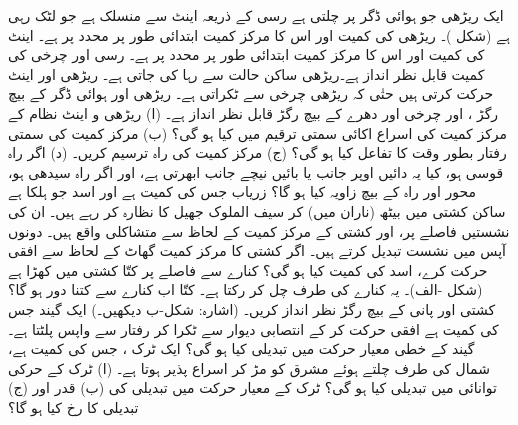 ایک ریڑھی جو ہوائی ڈگر پر چلتی ہے    رسی کے ذریعہ اینٹ سے منسلک  ہے جو لٹک رہی ہے (شکل )۔ ریڑھی کی کمیت  اور اس کا مرکز کمیت ابتدائی طور پر    محدد  پر ہے۔ اینٹ کی کمیت   اور اس کا مرکز کمیت ابتدائی طور پر  محدد   پر ہے۔ رسی اور چرخی کی کمیت قابل نظر انداز ہے۔ریڑھی ساکن حالت سے رہا کی جاتی ہے۔ ریڑھی اور اینٹ حرکت کرتی  ہیں  حتٰی کہ ریڑھی چرخی سے ٹکراتی ہے۔ ریڑھی اور  ہوائی ڈگر کے بیچ رگڑ  ، اور  چرخی اور دھرے  کے  بیچ  رگڑ قابل نظر انداز ہے۔ (ا) ریڑھی و اینٹ نظام کے مرکز کمیت کی اسراع اکائی سمتی ترقیم میں کیا  ہو   گی؟  (ب)  مرکز کمیت کی سمتی رفتار بطور وقت  کا تفاعل  کیا ہو گی؟ (ج) مرکز کمیت کی راہ ترسیم کریں۔ (د)  اگر راہ قوسی ہو، کیا یہ دائیں اوپر  جانب یا بائیں  نیچے جانب  ابھرتی ہے، اور اگر راہ سیدھی ہو،  محور اور راہ کے بیچ زاویہ کیا ہو گا؟
زریاب  جس کی کمیت  ہے اور اسد جو ہلکا ہے  ساکن  کشتی میں بیٹھ  (ناران میں) کر سیف  الملوک  جھیل کا نظارہ  کر رہے ہیں۔ ان   کی  نشستیں   فاصلے پر، اور کشتی کے مرکز کمیت کے لحاظ سے متشاکلی واقع ہیں۔ دونوں  آپس میں نشست  تبدیل کرتے ہیں۔ اگر کشتی کا مرکز کمیت  گھاٹ کے لحاظ سے  افقی حرکت کرے، اسد کی کمیت کیا ہو گی؟
کنارے سے  فاصلے پر  کتّا  کشتی میں کھڑا ہے (شکل -الف)۔ یہ کنارے کی طرف  چل کر رکتا ہے۔ کتّا  اب کنارے سے کتنا دور ہو گا؟   کشتی اور پانی کے بیچ رگڑ نظر انداز کریں۔ (اشارہ: شکل-ب دیکھیں۔)
ایک گیند جس کی کمیت  ہے  افقی حرکت کر کے انتصابی دیوار سے ٹکرا کر  رفتار سے واپس  پلٹتا ہے۔ گیند کے خطی معیار حرکت میں تبدیلی کیا ہو گی؟
ایک  ٹرک ، جس کی کمیت  ہے، شمال کی طرف  چلتے ہوئے مشرق  کو  مڑ کر   اسراع پذیر ہوتا ہے۔ (ا) ٹرک کے حرکی توانائی میں تبدیلی کیا ہو گی؟   ٹرک کے معیار حرکت میں تبدیلی کی (ب) قدر اور (ج)  تبدیلی کا رخ کیا ہو گا؟
